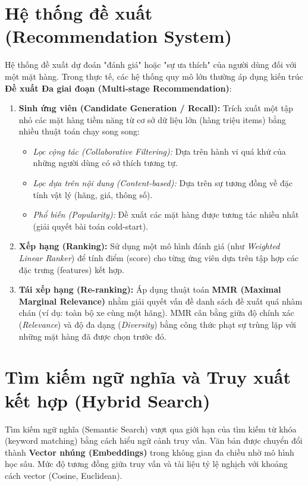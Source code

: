 \section{Hệ thống đề xuất (Recommendation System)}
Hệ thống đề xuất dự đoán "đánh giá" hoặc "sự ưa thích" của người dùng đối với một mặt hàng. Trong thực tế, các hệ thống quy mô lớn thường áp dụng kiến trúc \textbf{Đề xuất Đa giai đoạn (Multi-stage Recommendation)}:
\begin{enumerate}
    \item \textbf{Sinh ứng viên (Candidate Generation / Recall):} Trích xuất một tập nhỏ các mặt hàng tiềm năng từ cơ sở dữ liệu lớn (hàng triệu items) bằng nhiều thuật toán chạy song song:
    \begin{itemize}
        \item \textit{Lọc cộng tác (Collaborative Filtering):} Dựa trên hành vi quá khứ của những người dùng có sở thích tương tự.
        \item \textit{Lọc dựa trên nội dung (Content-based):} Dựa trên sự tương đồng về đặc tính vật lý (hãng, giá, thông số).
        \item \textit{Phổ biến (Popularity):} Đề xuất các mặt hàng được tương tác nhiều nhất (giải quyết bài toán cold-start).
    \end{itemize}
    \item \textbf{Xếp hạng (Ranking):} Sử dụng một mô hình đánh giá (như \textit{Weighted Linear Ranker}) để tính điểm (score) cho từng ứng viên dựa trên tập hợp các đặc trưng (features) kết hợp.
    \item \textbf{Tái xếp hạng (Re-ranking):} Áp dụng thuật toán \textbf{MMR (Maximal Marginal Relevance)} nhằm giải quyết vấn đề danh sách đề xuất quá nhàm chán (ví dụ: toàn bộ xe cùng một hãng). MMR cân bằng giữa độ chính xác (\textit{Relevance}) và độ đa dạng (\textit{Diversity}) bằng công thức phạt sự trùng lặp với những mặt hàng đã được chọn trước đó.
\end{enumerate}

\section{Tìm kiếm ngữ nghĩa và Truy xuất kết hợp (Hybrid Search)}
Tìm kiếm ngữ nghĩa (Semantic Search) vượt qua giới hạn của tìm kiếm từ khóa (keyword matching) bằng cách hiểu ngữ cảnh truy vấn. Văn bản được chuyển đổi thành \textbf{Vector nhúng (Embeddings)} trong không gian đa chiều nhờ mô hình học sâu. Mức độ tương đồng giữa truy vấn và tài liệu tỷ lệ nghịch với khoảng cách vector (Cosine, Euclidean).

